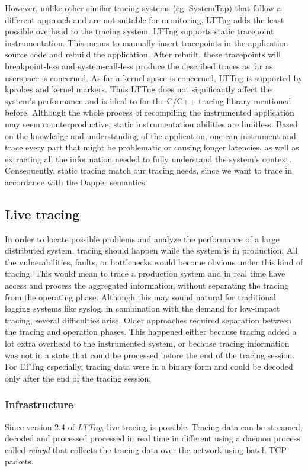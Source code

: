 \documentclass[a4paper,10pt,twocolumn]{article}
\begin{document}
However, unlike other similar tracing systems (eg. SystemTap\cite{systemtap})
that follow a different approach and are not suitable for monitoring, LTTng adds
the least possible overhead to the tracing system. LTTng supports static 
tracepoint instrumentation. This means to manually insert tracepoints in the 
application source code and rebuild the application. After rebuilt, these 
tracepoints will breakpoint-less and system-call-less produce the described 
traces as far as userspace is concerned. As far a kernel-space is concerned, 
LTTng is supported by kprobes and kernel markers. Thus LTTng does not 
significantly affect the system's performance and is ideal to for the C/C++
tracing library mentioned before.
Although the whole process of recompiling the instrumented application  may seem
counterproductive, static instrumentation abilities are limitless. Based on the
knowledge and understanding of the application, one can instrument and trace 
every part that might be problematic or causing longer latencies, as well as 
extracting all the information needed to fully understand the system's context.
Consequently, static tracing match our tracing needs, since we want to trace in
accordance with the Dapper semantics.

\subsection{Live tracing}
In order to locate possible problems and analyze the performance of a large 
distributed system, tracing should happen while the system is in production.
All the vulnerabilities, faults, or bottlenecks would become obvious under this
kind of tracing. This would mean to trace a production system and in real time 
have access and process the aggregated information, without separating the 
tracing from the operating phase. Although this may sound natural for 
traditional logging systems like syslog, in combination with the demand for
low-impact tracing, several difficulties arise. Older approaches required 
separation between the tracing and operation phases. This happened either 
because tracing added a lot extra overhead to the instrumented system, or 
because tracing information was not in a state that could be processed before 
the end of the tracing session. For LTTng especially, tracing data were in a 
binary form and could be decoded only after the end of the tracing session. 

\subsubsection{Infrastructure}
Since version 2.4 of \emph{LTTng}, live tracing is possible. Tracing 
data can be streamed, decoded and processed processed in real time in different
using a daemon process called \emph{relayd} that collects the tracing data over 
the network using batch TCP packets.  
\end{document}
